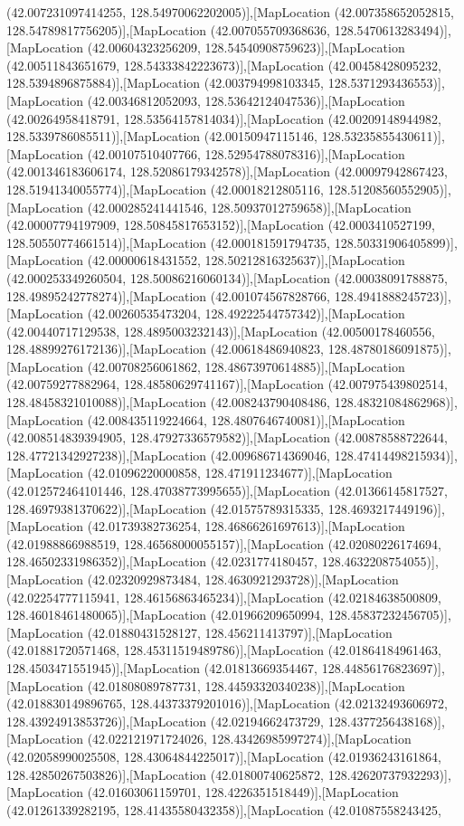 (42.007231097414255, 128.54970062202005)],[MapLocation (42.007358652052815, 128.54789817756205)],[MapLocation (42.007055709368636, 128.5470613283494)],[MapLocation (42.00604323256209, 128.54540908759623)],[MapLocation (42.00511843651679, 128.54333842223673)],[MapLocation (42.00458428095232, 128.5394896875884)],[MapLocation (42.003794998103345, 128.5371293436553)],[MapLocation (42.00346812052093, 128.53642124047536)],[MapLocation (42.00264958418791, 128.53564157814034)],[MapLocation (42.00209148944982, 128.5339786085511)],[MapLocation (42.00150947115146, 128.53235855430611)],[MapLocation (42.00107510407766, 128.52954788078316)],[MapLocation (42.001346183606174, 128.52086179342578)],[MapLocation (42.00097942867423, 128.51941340055774)],[MapLocation (42.00018212805116, 128.51208560552905)],[MapLocation (42.000285241441546, 128.50937012759658)],[MapLocation (42.00007794197909, 128.50845817653152)],[MapLocation (42.0003410527199, 128.50550774661514)],[MapLocation (42.000181591794735, 128.50331906405899)],[MapLocation (42.00000618431552, 128.50212816325637)],[MapLocation (42.000253349260504, 128.50086216060134)],[MapLocation (42.00038091788875, 128.49895242778274)],[MapLocation (42.001074567828766, 128.4941888245723)],[MapLocation (42.00260535473204, 128.49222544757342)],[MapLocation (42.00440717129538, 128.4895003232143)],[MapLocation (42.00500178460556, 128.48899276172136)],[MapLocation (42.00618486940823, 128.48780186091875)],[MapLocation (42.00708256061862, 128.48673970614885)],[MapLocation (42.00759277882964, 128.48580629741167)],[MapLocation (42.007975439802514, 128.48458321010088)],[MapLocation (42.008243790408486, 128.48321084862968)],[MapLocation (42.008435119224664, 128.4807646740081)],[MapLocation (42.008514839394905, 128.47927336579582)],[MapLocation (42.00878588722644, 128.47721342927238)],[MapLocation (42.009686714369046, 128.47414498215934)],[MapLocation (42.01096220000858, 128.471911234677)],[MapLocation (42.012572464101446, 128.47038773995655)],[MapLocation (42.01366145817527, 128.46979381370622)],[MapLocation (42.01575789315335, 128.4693217449196)],[MapLocation (42.01739382736254, 128.46866261697613)],[MapLocation (42.01988866988519, 128.46568000055157)],[MapLocation (42.02080226174694, 128.46502331986352)],[MapLocation (42.0231774180457, 128.4632208754055)],[MapLocation (42.02320929873484, 128.4630921293728)],[MapLocation (42.02254777115941, 128.46156863465234)],[MapLocation (42.02184638500809, 128.46018461480065)],[MapLocation (42.01966209650994, 128.45837232456705)],[MapLocation (42.01880431528127, 128.456211413797)],[MapLocation (42.01881720571468, 128.45311519489786)],[MapLocation (42.01864184961463, 128.4503471551945)],[MapLocation (42.01813669354467, 128.44856176823697)],[MapLocation (42.01808089787731, 128.44593320340238)],[MapLocation (42.018830149896765, 128.44373379201016)],[MapLocation (42.02132493606972, 128.43924913853726)],[MapLocation (42.02194662473729, 128.4377256438168)],[MapLocation (42.022121971724026, 128.43426985997274)],[MapLocation (42.02058990025508, 128.43064844225017)],[MapLocation (42.01936243161864, 128.42850267503826)],[MapLocation (42.01800740625872, 128.42620737932293)],[MapLocation (42.01603061159701, 128.4226351518449)],[MapLocation (42.01261339282195, 128.41435580432358)],[MapLocation (42.01087558243425, 